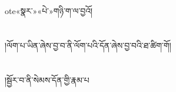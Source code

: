 ote{«སྣར་»«པེ་»གཉི་ག་ལ་}བྱའོ།\chapter{ }།ལོག་པ་ཡིན་ཞེས་བྱ་བ་ནི་ལོག་པའི་དོན་ཞེས་བྱ་བའི་ཐ་ཚིག་གོ།\chapter{ }།སྦྱོར་བ་ནི་སེམས་དོན་གྱི་རྣམ་པ